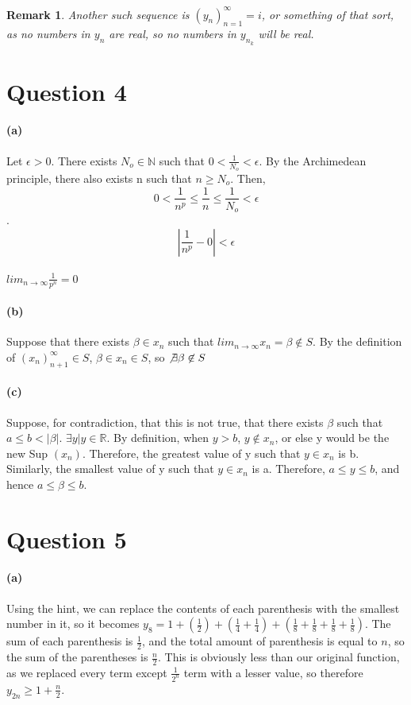 \documentclass[10pt,letter]{article}
\newtheorem*{remark}{Remark}
\begin{document}
\begin{remark}
Another such sequence is $(y_n)_{n=1}^\infty = i$, or something of that sort, as no numbers in $y_n$ are real, so no numbers in $y_{n_k}$ will be real.
\end{remark}


\section*{Question 4}

\paragraph{(a)} 
Let $\epsilon > 0$. There exists $N_o \in \mathbb{N}$ such that $0 < \frac{1}{N_o} < \epsilon$. By the Archimedean principle, there also exists n such that $n \geq N_o$. Then, $$0 < \frac{1}{n^p} \leq \frac{1}{n} \leq \frac{1}{N_o} < \epsilon$$.
$$|\frac{1}{n^p} - 0| < \epsilon$$\\
$lim_{n\rightarrow\infty}\frac{1}{p^n} = 0$

\paragraph{(b)} 
Suppose that there exists $\beta \in x_n$ such that $lim_{n\rightarrow\infty} x_n = \beta \not\in S$. By the definition of $(x_n)_{n+1}^\infty \in S$, $\beta \in x_n \in S$, so $\not\exists \beta \not\in S$

\paragraph{(c)} 
Suppose, for contradiction, that this is not true, that there exists $\beta$ such that $a \leq b <|\beta|$. $\exists y | y \in \mathbb{R}$. By definition, when $y > b$, $y \not\in x_n$, or else y would be the new Sup $(x_n)$. Therefore, the greatest value of y such that $y \in x_n$ is b. Similarly, the smallest value of y such that $y \in x_n$ is a. Therefore, $a \leq y \leq b$, and hence $a \leq \beta \leq b$. 

\section*{Question 5}

\paragraph{(a)} 
Using the hint, we can replace the contents of each parenthesis with the smallest number in it, so it becomes $y_8 = 1 + (\frac{1}{2}) + (\frac{1}{4}+\frac{1}{4}) + (\frac{1}{8} + \frac{1}{8} + \frac{1}{8} + \frac{1}{8})$. The sum of each parenthesis is $\frac{1}{2}$, and the total amount of parenthesis is equal to $n$, so the sum of the parentheses is $\frac{n}{2}$. This is obviously less than our original function, as we replaced every term except $\frac{1}{2^n}$ term with a lesser value, so therefore $y_{2n} \geq 1 + \frac{n}{2}$. 
\end{document}
